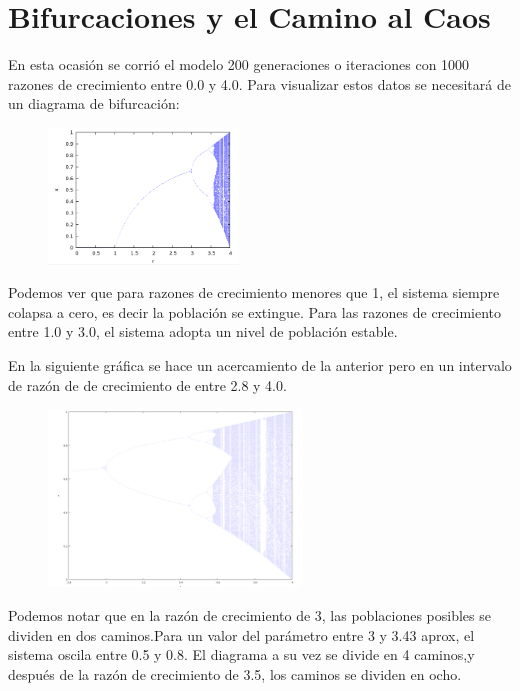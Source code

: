 \documentclass[a4paper]{article}
\begin{document}
\newpage

\section{Bifurcaciones y el Camino al Caos}

En esta ocasión se corrió el modelo 200 generaciones o iteraciones con 1000 razones de crecimiento entre 0.0 y 4.0. Para visualizar estos datos se necesitará de un diagrama de bifurcación:

\begin{figure}[ht!]
\centering
\includegraphics[width=0.45\textwidth]{Bifurcation1.png}
\end{figure}


Podemos ver que para razones de crecimiento menores que 1, el sistema siempre colapsa a cero, es decir la población se extingue. Para las razones de crecimiento entre 1.0 y 3.0, el sistema adopta un nivel de población estable.

En la siguiente gráfica se hace un acercamiento de la anterior pero en un intervalo de razón de de crecimiento de entre 2.8 y 4.0. 


\begin{figure}[ht!]
\centering
\includegraphics[width=0.6\textwidth]{Bifurcation2.png}
\end{figure}

Podemos notar que en la razón de crecimiento de 3, las poblaciones posibles se dividen en dos caminos.Para un valor del parámetro entre 3 y 3.43 aprox, el sistema oscila entre 0.5 y 0.8. El diagrama a su vez se divide en 4 caminos,y después de la razón de crecimiento de 3.5, los caminos se dividen en ocho.
\end{document}
